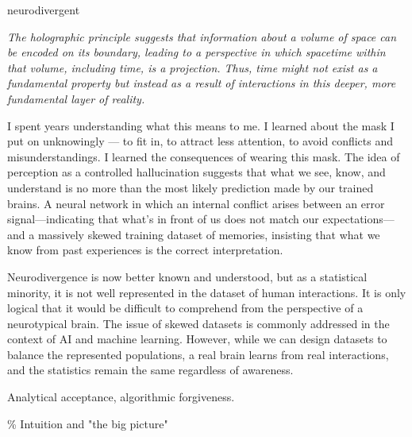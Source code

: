 \begin{center}
\Huge neurodivergent
\vspace{2cm}
\begin{flushright}
\large
\textit{The holographic principle suggests that information about a volume of space can be encoded on its boundary, leading to a perspective in which spacetime within that volume, including time, is a projection. Thus, time might not exist as a fundamental property but instead as a result of interactions in this deeper, more fundamental layer of reality.}
\end{flushright}
\vspace{2cm}
\end{center}
\normalsize

I spent years understanding what this means to me. I learned about the mask I put on unknowingly — to fit in, to attract less attention, to avoid conflicts and misunderstandings. I learned the consequences of wearing this mask. The idea of perception as a controlled hallucination suggests that what we see, know, and understand is no more than the most likely prediction made by our trained brains. A neural network in which an internal conflict arises between an error signal—indicating that what’s in front of us does not match our expectations—and a massively skewed training dataset of memories, insisting that what we know from past experiences is the correct interpretation.

Neurodivergence is now better known and understood, but as a statistical minority, it is not well represented in the dataset of human interactions. It is only logical that it would be difficult to comprehend from the perspective of a neurotypical brain. The issue of skewed datasets is commonly addressed in the context of AI and machine learning. However, while we can design datasets to balance the represented populations, a real brain learns from real interactions, and the statistics remain the same regardless of awareness.

Analytical acceptance, algorithmic forgiveness.

{\scriptsize \textcolor{comment}{\%  Intuition and "the big picture" }}

